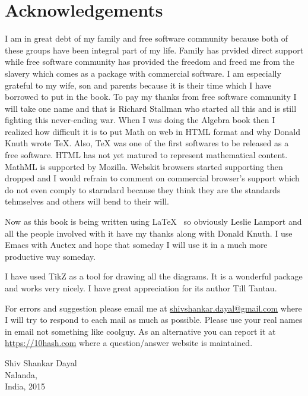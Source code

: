 \section*{Acknowledgements}
I am in great debt of my family and free software community because both of
these groups have been integral part of my life. Family has prvided direct
support while free software community has provided the freedom and freed me
from the slavery which comes as a package with commercial software. I am
especially grateful to my wife, son and parents because it is their time which
I have borrowed to put in the book. To pay my thanks from free software
community  I will take one name and that is Richard Stallman who started all
this  and is still fighting this never-ending war. When I was doing the Algebra
book then I realized how difficult it is to put Math on web in HTML format and
why Donald Knuth wrote \TeX{}. Also, \TeX{} was one of the first softwares to
be released as a free software. HTML has not yet matured to represent
mathematical content. MathML is supported by Mozilla. Webskit browsers started
supporting  then dropped and I would refrain to comment on commercial browser's support which do not even comply to starndard because they think they are the standards tehmselves and others will bend to their will.

Now as this book is being written using \LaTeX{}~ so obviously Leslie Lamport
and all the people involved with it have my thanks along with Donald Knuth. I
use Emacs with Auctex and hope that someday I will use it in a much more
productive way someday.

I have used TikZ as a tool for drawing all the diagrams. It is a wonderful
package and works very nicely. I have great appreciation for its author Till
Tantau.


For errors and suggestion please email me at
\href{mailto:shivshankar.dayal@gmail.com}{shivshankar.dayal@gmail.com} where I
will try to respond to each mail as
much as possible. Please use your real names in email not something like
coolguy. As an alternative you can report it at
\url{https://10hash.com} where a question/answer website is maintained.
\begin{flushright}
Shiv Shankar Dayal\\
Nalanda,\\
India, 2015
\end{flushright}
